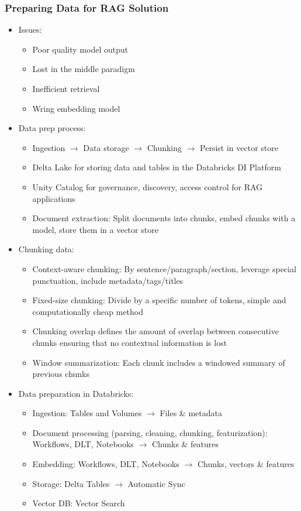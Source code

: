\documentclass[11pt]{scrartcl}
\begin{document}
\subsubsection*{Preparing Data for RAG Solution}
\begin{itemize}
	\item Issues:
	\begin{itemize}
		\item Poor quality model output
		\item Lost in the middle paradigm
		\item Inefficient retrieval
		\item Wring embedding model
	\end{itemize}
	\item Data prep process:
	\begin{itemize}
		\item Ingestion $\to$ Data storage $\to$ Chunking $\to$ Persist in vector store
		\item Delta Lake for storing data and tables in the Databricks DI Platform
		\item Unity Catalog for governance, discovery, access control for RAG applications
		\item Document extraction: Split documents into chunks, embed chunks with a model, store them in a vector store
	\end{itemize}
	\item Chunking data:
	\begin{itemize}
		\item Context-aware chunking: By sentence/paragraph/section, leverage special punctuation, include metadata/tags/titles
		\item Fixed-size chunking: Divide by a specific number of tokens, simple and computationally cheap method
		\item Chunking overlap defines the amount of overlap between consecutive chunks ensuring that no contextual information is lost
		\item Window summarization: Each chunk includes a windowed summary of previous chunks
	\end{itemize}
	\item Data preparation in Databricks:
	\begin{itemize}
		\item Ingestion: Tables and Volumes $\to$ Files \& metadata
		\item Document processing (parsing, cleaning, chunking, featurization): Workflows, DLT, Notebooks $\to$ Chunks \& features
		\item Embedding: Workflows, DLT, Notebooks $\to$ Chunks, vectors \& features
		\item Storage: Delta Tables $\to$ Automatic Sync
		\item Vector DB: Vector Search
	\end{itemize}
\end{itemize}
\end{document}
